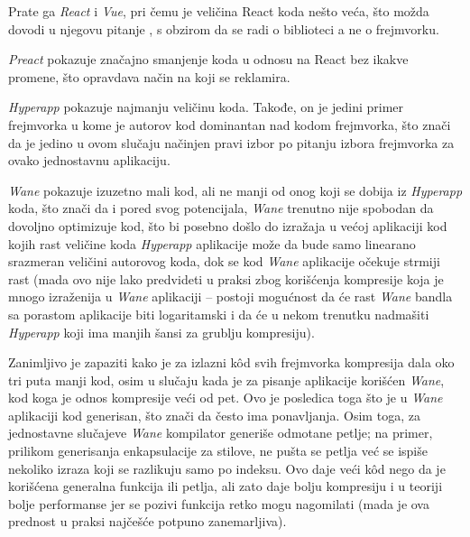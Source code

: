 Prate ga \textsl{React} i \textsl{Vue}, pri čemu je veličina React koda nešto veća, što možda dovodi u njegovu pitanje , s obzirom da se radi o biblioteci a ne o frejmvorku.

\textsl{Preact} pokazuje značajno smanjenje koda u odnosu na React bez ikakve promene, što opravdava način na koji se reklamira.

\textsl{Hyperapp} pokazuje najmanju veličinu koda.
Takođe, on je jedini primer frejmvorka u kome je autorov kod dominantan nad kodom frejmvorka, što znači da je jedino u ovom slučaju načinjen pravi izbor po pitanju izbora frejmvorka za ovako jednostavnu aplikaciju.

\textsl{Wane} pokazuje izuzetno mali kod, ali ne manji od onog koji se dobija iz \textsl{Hyperapp} koda, što znači da i pored svog potencijala, \textsl{Wane} trenutno nije spobodan da dovoljno optimizuje kod, što bi posebno došlo do izražaja u većoj aplikaciji kod kojih rast veličine koda \textsl{Hyperapp} aplikacije može da bude samo linearano srazmeran veličini autorovog koda, dok se kod \textsl{Wane} aplikacije očekuje strmiji rast (mada ovo nije lako predvideti u praksi zbog korišćenja kompresije koja je mnogo izraženija u \textsl{Wane} aplikaciji -- postoji mogućnost da će rast \textsl{Wane} bandla sa porastom aplikacije biti logaritamski i da će u nekom trenutku nadmašiti \textsl{Hyperapp} koji ima manjih šansi za grublju kompresiju).

Zanimljivo je zapaziti kako je za izlazni kôd svih frejmvorka kompresija dala oko tri puta manji kod, osim u slučaju kada je za pisanje aplikacije korišćen \textsl{Wane}, kod koga je odnos kompresije veći od pet.
Ovo je posledica toga što je u \textsl{Wane} aplikaciji kod generisan, što znači da često ima ponavljanja.
Osim toga, za jednostavne slučajeve \textsl{Wane} kompilator generiše odmotane petlje; na primer, prilikom generisanja enkapsulacije za stilove, ne pušta se petlja već se ispiše nekoliko izraza koji se razlikuju samo po indeksu.
Ovo daje veći kôd nego da je korišćena generalna funkcija ili  petlja, ali zato daje bolju kompresiju i u teoriji bolje performanse jer se pozivi funkcija retko mogu nagomilati (mada je ova prednost u praksi najčešće potpuno zanemarljiva).

